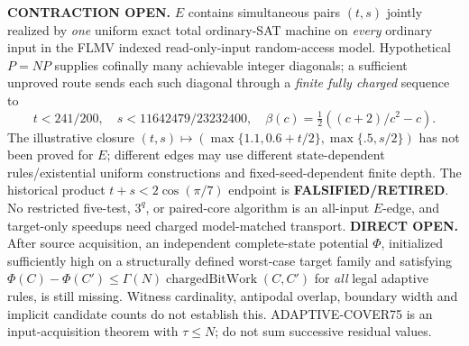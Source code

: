 \documentclass[11pt]{article}
\begin{document}
\textbf{CONTRACTION OPEN.} \(E\) contains simultaneous pairs \((t,s)\) jointly realized by \emph{one} uniform exact total ordinary-SAT machine on \emph{every} ordinary input in the FLMV indexed read-only-input random-access model. Hypothetical \(P=NP\) supplies cofinally many achievable integer diagonals; a sufficient unproved route sends each such diagonal through a \emph{finite fully charged} sequence to
\[
t<241/200,\quad s<11642479/23232400,\quad
\beta(c)=\tfrac12((c+2)/c^2-c).
\]
The illustrative closure \((t,s)\mapsto(\max\{1.1,0.6+t/2\},\max\{.5,s/2\})\) has not been proved for \(E\); different edges may use different state-dependent rules/existential uniform constructions and fixed-seed-dependent finite depth. The historical product \(t+s<2\cos(\pi/7)\) endpoint is \textbf{FALSIFIED/RETIRED}. No restricted five-test, \(3^q\), or paired-core algorithm is an all-input \(E\)-edge, and target-only speedups need charged model-matched transport.
\textbf{DIRECT OPEN.} After source acquisition, an independent complete-state potential \(\Phi\), initialized sufficiently high on a structurally defined worst-case target family and satisfying \(\Phi(C)-\Phi(C')\le\Gamma(N)\operatorname{chargedBitWork}(C,C')\) for \emph{all} legal adaptive rules, is still missing. Witness cardinality, antipodal overlap, boundary width and implicit candidate counts do not establish this. ADAPTIVE-COVER75 is an input-acquisition theorem with \(\tau\le N\); do not sum successive residual values.
\end{document}
